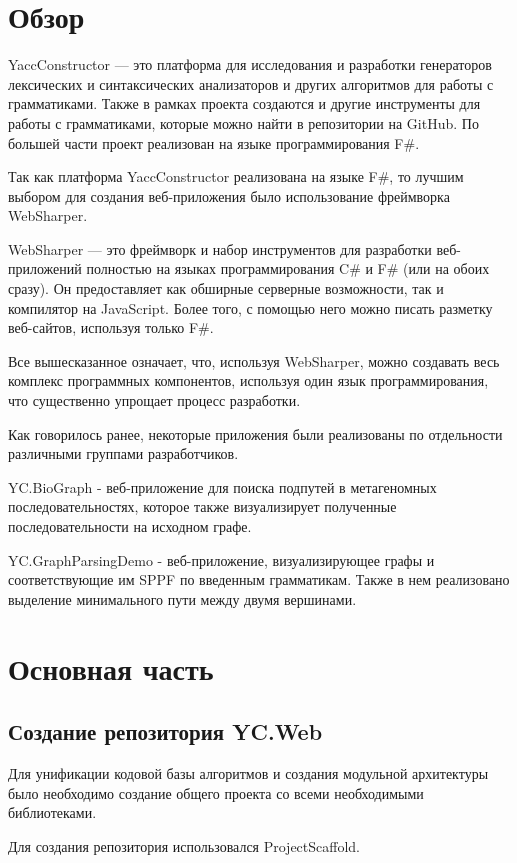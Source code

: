 \documentclass[14pt]{matmex-diploma}
\begin{document}
\section {Обзор}
YaccConstructor — это платформа для исследования и разработки генераторов лексических и синтаксических анализаторов и других алгоритмов для работы с грамматиками. Также в рамках проекта создаются и другие инструменты для работы с грамматиками, которые можно найти в репозитории на GitHub. По большей части проект реализован на языке программирования F\#.

Так как платформа YaccConstructor реализована на языке F\#, то  лучшим выбором для создания веб-приложения было использование фреймворка WebSharper.

WebSharper — это фреймворк и набор инструментов для разработки веб-приложений полностью на языках программирования C\# и F\# (или на обоих сразу). Он предоставляет как обширные серверные возможности, так и компилятор на JavaScript. Более того, с помощью него можно писать разметку веб-сайтов, используя только F\#. 

Все вышесказанное означает, что, используя WebSharper, можно создавать весь комплекс программных компонентов, используя один язык программирования, что существенно упрощает процесс разработки.

Как говорилось ранее, некоторые приложения были реализованы по отдельности различными группами разработчиков. 

 YC.BioGraph - веб-приложение для поиска подпутей в метагеномных последовательностях, которое также визуализирует полученные последовательности на исходном графе.

YC.GraphParsingDemo - веб-приложение, визуализирующее графы и соответствующие им SPPF по введенным грамматикам. Также в нем реализовано выделение минимального пути между двумя вершинами.

\section {Основная часть}
\subsection{Создание репозитория YC.Web}

Для унификации кодовой базы алгоритмов и создания модульной архитектуры  было необходимо создание общего проекта со всеми необходимыми библиотеками. 
	
Для создания репозитория использовался ProjectScaffold. 
\end{document}
